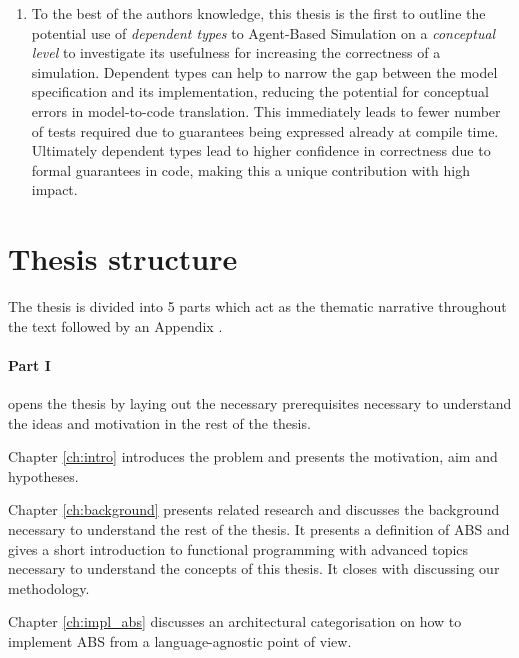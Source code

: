 \begin{enumerate}
	\item To the best of the authors knowledge, this thesis is the first to outline the potential use of \textit{dependent types} to Agent-Based Simulation on a \textit{conceptual level} to investigate its usefulness for increasing the correctness of a simulation. Dependent types can help to narrow the gap between the model specification and its implementation, reducing the potential for conceptual errors in model-to-code translation. This immediately leads to fewer number of tests required due to guarantees being expressed already at compile time. Ultimately dependent types lead to higher confidence in correctness due to formal guarantees in code, making this a unique contribution with high impact.
\end{enumerate}

\section{Thesis structure}

The thesis is divided into 5 parts which act as the thematic narrative throughout the text followed by an Appendix . 

\paragraph{Part I} opens the thesis by laying out the necessary prerequisites necessary to understand the ideas and motivation in the rest of the thesis.
\medskip

Chapter \ref{ch:intro} introduces the problem and presents the motivation, aim and hypotheses.

\medskip

Chapter \ref{ch:background} presents related research and discusses the background necessary to understand the rest of the thesis. It presents a definition of ABS and gives a short introduction to functional programming with advanced topics necessary to understand the concepts of this thesis. It closes with discussing our methodology.

\medskip

Chapter \ref{ch:impl_abs} discusses an architectural categorisation on how to implement ABS from a language-agnostic point of view. 

\medskip

